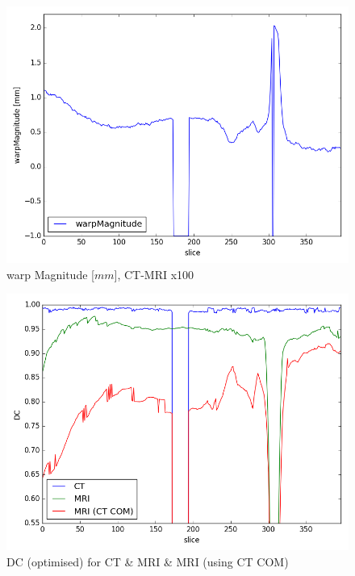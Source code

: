 \documentclass[parskip,bibtotoc,final,twoside=false,titlepage,a4paper,english,12pt,titlepage,a4paper]{scrbook}
\begin{document}
\begin{figure}[!tp]
    \centering
    \includegraphics[scale=0.65]{python/warp/warpMagnitude_x100--.png}
    \caption{warp Magnitude [$mm$], CT-MRI x100}
    \label{fig:warpMagnitude_x100}
\end{figure}
\begin{figure}[!bp]
    \centering
    \includegraphics[scale=0.65]{python/dice/CT_MR_x100_DC.png}
    \caption{DC (optimised) for CT \& MRI \& MRI (using CT COM)}
    \label{fig:CT_MR_x100_DC}
\end{figure}
\end{document}
